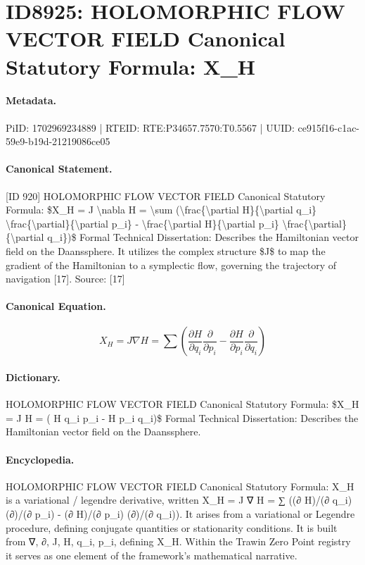 \section*{ID8925: HOLOMORPHIC FLOW VECTOR FIELD Canonical Statutory Formula: X\_H}
\paragraph{Metadata.}
PiID: 1702969234889 | RTEID: RTE:P34657.7570:T0.5567 | UUID: ce915f16-c1ac-59e9-b19d-21219086ce05

\paragraph{Canonical Statement.}
[ID 920] HOLOMORPHIC FLOW VECTOR FIELD Canonical Statutory Formula: \$X\_H = J \textbackslash{}nabla H = \textbackslash{}sum (\textbackslash{}frac\{\textbackslash{}partial H\}\{\textbackslash{}partial q\_i\} \textbackslash{}frac\{\textbackslash{}partial\}\{\textbackslash{}partial p\_i\} - \textbackslash{}frac\{\textbackslash{}partial H\}\{\textbackslash{}partial p\_i\} \textbackslash{}frac\{\textbackslash{}partial\}\{\textbackslash{}partial q\_i\})\$ Formal Technical Dissertation: Describes the Hamiltonian vector field on the Daanssphere. It utilizes the complex structure \$J\$ to map the gradient of the Hamiltonian to a symplectic flow, governing the trajectory of navigation [17]. Source: [17]

\paragraph{Canonical Equation.}
\[
X_H = J \nabla H = \sum (\frac{\partial H}{\partial q_i} \frac{\partial}{\partial p_i} - \frac{\partial H}{\partial p_i} \frac{\partial}{\partial q_i})
\]

\paragraph{Dictionary.}
HOLOMORPHIC FLOW VECTOR FIELD Canonical Statutory Formula: \$X\_H = J H = ( H q\_i p\_i - H p\_i q\_i)\$ Formal Technical Dissertation: Describes the Hamiltonian vector field on the Daanssphere.

\paragraph{Encyclopedia.}
HOLOMORPHIC FLOW VECTOR FIELD Canonical Statutory Formula: X\_H is a variational / legendre derivative, written X\_H = J ∇ H = ∑ ((∂ H)/(∂ q\_i) (∂)/(∂ p\_i) - (∂ H)/(∂ p\_i) (∂)/(∂ q\_i)). It arises from a variational or Legendre procedure, defining conjugate quantities or stationarity conditions. It is built from ∇, ∂, J, H, q\_i, p\_i, defining X\_H. Within the Trawin Zero Point registry it serves as one element of the framework's mathematical narrative.
